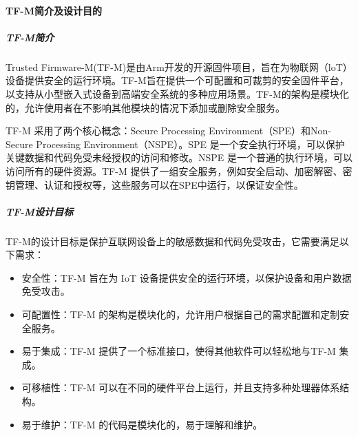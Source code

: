 \documentclass[12pt,a4paper]{ctexart}
\numberwithin{figure}{section}
\begin{document}
\paragraph{TF-M简介及设计目的}
\subparagraph{TF-M简介}
\par Trusted Firmware-M(TF-M)是由Arm开发的开源固件项目，旨在为物联网（loT）设备提供安全的运行环境。TF-M旨在提供一个可配置和可裁剪的安全固件平台，以支持从小型嵌入式设备到高端安全系统的多种应用场景。TF-M的架构是模块化的，允许使用者在不影响其他模块的情况下添加或删除安全服务。
\par TF-M 采用了两个核心概念：Secure Processing Environment（SPE）和Non-Secure Processing Environment（NSPE）。SPE 是一个安全执行环境，可以保护关键数据和代码免受未经授权的访问和修改。NSPE 是一个普通的执行环境，可以访问所有的硬件资源。TF-M 提供了一组安全服务，例如安全启动、加密解密、密钥管理、认证和授权等，这些服务可以在SPE中运行，以保证安全性。
\subparagraph{TF-M设计目标}
\par TF-M的设计目标是保护互联网设备上的敏感数据和代码免受攻击，它需要满足以下需求：
\begin{itemize}
    \item 安全性：TF-M 旨在为 IoT 设备提供安全的运行环境，以保护设备和用户数据免受攻击。
    \item 可配置性：TF-M 的架构是模块化的，允许用户根据自己的需求配置和定制安全服务。
    \item 易于集成：TF-M 提供了一个标准接口，使得其他软件可以轻松地与TF-M 集成。
    \item 可移植性：TF-M 可以在不同的硬件平台上运行，并且支持多种处理器体系结构。
    \item 易于维护：TF-M 的代码是模块化的，易于理解和维护。
\end{itemize}
\end{document}
